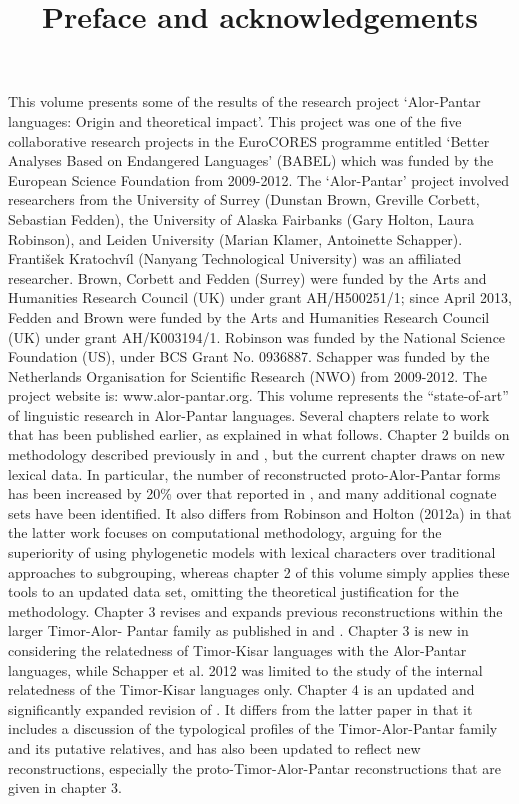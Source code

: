 \documentclass[output=paper]{LSP/langsci}
\title{Preface and acknowledgements}
\begin{document}
This volume presents some of the results of the research project `Alor-Pantar languages: Origin and theoretical impact'. This project was one of the five collaborative research projects in the EuroCORES programme entitled `Better Analyses Based on Endangered Languages' (BABEL) which was funded by the European Science Foundation from 2009-2012. The `Alor-Pantar' project involved researchers from the University of Surrey (Dunstan Brown, Greville Corbett, Sebastian Fedden), the University of Alaska Fairbanks (Gary Holton, Laura Robinson), and Leiden University (Marian Klamer, Antoinette Schapper). František Kratochvíl (Nanyang Technological University) was an affiliated researcher. Brown, Corbett and Fedden (Surrey) were funded by the Arts and Humanities Research Council (UK) under grant AH/H500251/1; since April 2013, Fedden and Brown were funded by the Arts and Humanities Research Council (UK) under grant AH/K003194/1. Robinson was funded by the National Science Foundation (US), under BCS Grant No. 0936887. Schapper was funded by the Netherlands Organisation for Scientific Research (NWO) from 2009-2012. The project website is: www.alor-pantar.org.  
	This volume represents the ``state-of-art'' of linguistic research in Alor-Pantar languages. Several chapters relate to work that has been published earlier, as explained in what follows. 
	Chapter 2 builds on methodology described previously in \citet{HoltonEtAl2012} and \citet{RobinsonEtAl2012a}, but the current chapter draws on new lexical data. In particular, the number of reconstructed proto-Alor-Pantar forms has been increased by 20\% over that reported in \citet{HoltonEtAl2012}, and many additional cognate sets have been identified. It also differs from Robinson and Holton (2012a) in that the latter work focuses on computational methodology, arguing for the superiority of using phylogenetic models with lexical characters over traditional approaches to subgrouping, whereas chapter 2 of this volume simply applies these tools to an updated data set, omitting the theoretical justification for the methodology. 
	Chapter 3 revises and expands previous reconstructions within the larger Timor-Alor- Pantar family as published in \citet{HoltonEtAl2012} and \citet{SchapperEtAl2012}. Chapter 3 is new in considering the relatedness of Timor-Kisar languages with the Alor-Pantar languages, while Schapper et al. 2012 was limited to the study of the internal relatedness of the Timor-Kisar languages only.
	Chapter 4 is an updated and significantly expanded revision of \citet{RobinsonEtAl2012b}. It differs from the latter paper in that it includes a discussion of the typological profiles of the Timor-Alor-Pantar family and its putative relatives, and has also been updated to reflect new reconstructions, especially the proto-Timor-Alor-Pantar reconstructions that are given in chapter 3. 
\end{document}
